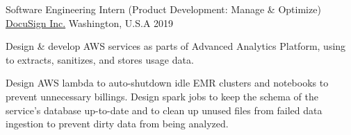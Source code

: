 \begin{cventries}
  \cvwork
    {Software Engineering Intern (Product Development: Manage \& Optimize)} %
    {\href{https://www.docusign.com/}{DocuSign Inc.}} %
    {Washington, U.S.A} %
    {2019} %
    {
      \begin{cvitems} %
        \item {
          Design \& develop AWS services as parts of Advanced Analytics Platform, using to extracts, sanitizes, and stores usage data.
        }
        \item {
          Design AWS lambda to auto-shutdown idle EMR clusters and notebooks to prevent unnecessary billings.
          Design spark jobs to keep the schema of the service's database up-to-date and to clean up unused files from failed data ingestion to prevent dirty data from being analyzed.
        }
      \end{cvitems}
    }

\end{cventries}
